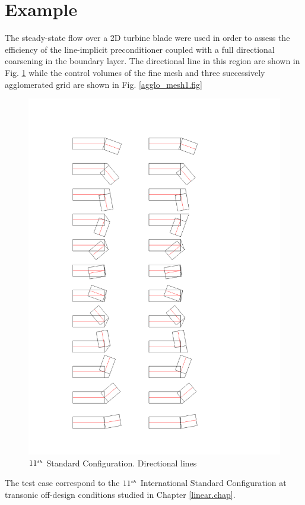 \section{Example}
%
%
 The steady-state flow over a 2D turbine blade were used
 in order to assess the efficiency of the line-implicit preconditioner
 coupled with a full directional coarsening in the boundary layer.
 The directional line in this region are shown in Fig. \ref{lines.fig}
 while the control volumes of the fine mesh and three successively
 agglomerated grid are shown in Fig. \ref{agglo_mesh1.fig}
%
\begin{figure}[ht]
   \centerline{\includegraphics[width=120mm,clip=t]{APPEND/FIGURE/lines.pdf}}
  \caption{$11^{\mbox{\tiny $th$}}$ Standard Configuration. Directional lines}
 \label{lines.fig}
\end{figure}
%
 The test case correspond to the $11^{\mbox{\tiny $th$}}$ International Standard Configuration
 at transonic off-design conditions studied in Chapter \ref{linear.chap}.
%
